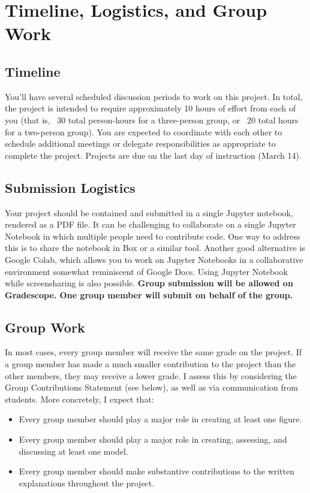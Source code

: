 \documentclass[12pt]{article}
\begin{document}
\section{Timeline, Logistics, and Group Work}

\subsection{Timeline}
You’ll have several scheduled discussion periods to work on this project. In total, the project is intended to require approximately 10 hours of effort from each of you (that is, ~30 total person-hours for a three-person group, or ~20 total hours for a two-person group). You are expected to coordinate with each other to schedule additional meetings or delegate responsibilities as appropriate to complete the project. Projects are due on the last day of instruction (March 14). 

\subsection{Submission Logistics}
Your project should be contained and submitted in a single Jupyter notebook, rendered as a PDF file. 
It can be challenging to collaborate on a single Jupyter Notebook in which multiple people need to contribute code. One way to address this is to share the notebook in Box or a similar tool. Another good alternative is Google Colab, which allows you to work on Jupyter Notebooks in a collaborative environment somewhat reminiscent of Google Docs. Using Jupyter Notebook while screensharing is also possible. {\bf Group submission will be allowed on Gradescope. One group member will submit on behalf of the group.}

\subsection{Group Work}
In most cases, every group member will receive the same grade on the project. If a group member has made a much smaller contribution to the project than the other members, they may receive a lower grade. I assess this by considering the Group Contributions Statement (see below), as well as via communication from students.
More concretely, I expect that:
\begin{itemize}
\item Every group member should play a major role in creating at least one figure.
\item Every group member should play a major role in creating, assessing, and discussing at least one model.
\item Every group member should make substantive contributions to the written explanations throughout the project.
\end{itemize}
\end{document}
